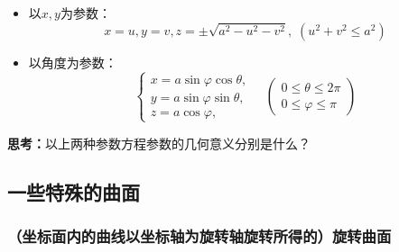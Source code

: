 \begin{itemize}
  \item {以$x,y$为参数：} 
  $${x=u,y=v,z=\pm\sqrt{a^2-u^2-v^2},\;(u^2+v^2\leq a^2)}$$
  \vspace{-2em} 
  \item {以角度为参数：} 
  $${\left\{\begin{array}{l}
  	x=a\sin\varphi\cos\theta,\\
  	y=a\sin\varphi\sin\theta,\\
  	z=a\cos\varphi,
  \end{array}\right.
  \quad\left(\begin{array}{c}
  	0\leq\theta\leq 2\pi\\
  	0\leq\varphi\leq\pi
  \end{array}\right)}$$
\end{itemize}

{\bf 思考：}以上两种参数方程参数的几何意义分别是什么？

\begin{center}
\end{center}

\subsection{一些特殊的曲面}

\subsubsection{（坐标面内的曲线以坐标轴为旋转轴旋转所得的）旋转曲面}

